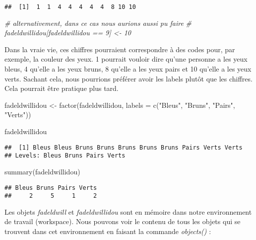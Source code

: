\documentclass[
]{book}
\newenvironment{Shaded}{\begin{snugshade}}{\end{snugshade}}
\newcommand{\AttributeTok}[1]{\textcolor[rgb]{0.77,0.63,0.00}{#1}}
\newcommand{\CommentTok}[1]{\textcolor[rgb]{0.56,0.35,0.01}{\textit{#1}}}
\newcommand{\FunctionTok}[1]{\textcolor[rgb]{0.00,0.00,0.00}{#1}}
\newcommand{\NormalTok}[1]{#1}
\newcommand{\OtherTok}[1]{\textcolor[rgb]{0.56,0.35,0.01}{#1}}
\newcommand{\StringTok}[1]{\textcolor[rgb]{0.31,0.60,0.02}{#1}}
\begin{document}
\begin{verbatim}
##  [1]  1  1  4  4  4  4  4  8 10 10
\end{verbatim}

\begin{Shaded}
\begin{Highlighting}[]
\CommentTok{\# alternativement, dans ce cas nous aurions aussi pu faire }
\CommentTok{\# fadeldwillidou[fadeldwillidou == 9] \textless{}{-} 10}
\end{Highlighting}
\end{Shaded}

Dans la vraie vie, ces chiffres pourraient correspondre à des codes pour, par exemple, la couleur des yeux. 1 pourrait vouloir dire qu'une personne a les yeux bleus, 4 qu'elle a les yeux bruns, 8 qu'elle a les yeux pairs et 10 qu'elle a les yeux verts. Sachant cela, nous pourrions préférer avoir les labels plutôt que les chiffres. Cela pourrait être pratique plus tard.

\begin{Shaded}
\begin{Highlighting}[]
\NormalTok{fadeldwillidou }\OtherTok{\textless{}{-}} \FunctionTok{factor}\NormalTok{(fadeldwillidou, }
                          \AttributeTok{labels =} \FunctionTok{c}\NormalTok{(}\StringTok{"Bleus"}\NormalTok{, }\StringTok{"Bruns"}\NormalTok{, }
                                     \StringTok{"Pairs"}\NormalTok{, }\StringTok{"Verts"}\NormalTok{))}

\NormalTok{fadeldwillidou}
\end{Highlighting}
\end{Shaded}

\begin{verbatim}
##  [1] Bleus Bleus Bruns Bruns Bruns Bruns Bruns Pairs Verts Verts
## Levels: Bleus Bruns Pairs Verts
\end{verbatim}

\begin{Shaded}
\begin{Highlighting}[]
\FunctionTok{summary}\NormalTok{(fadeldwillidou)}
\end{Highlighting}
\end{Shaded}

\begin{verbatim}
## Bleus Bruns Pairs Verts 
##     2     5     1     2
\end{verbatim}

Les objets \emph{fadeldwill} et \emph{fadeldwillidou} sont en mémoire dans notre environnement de travail (workspace). Nous pouvons voir le contenu de tous les objets qui se trouvent dans cet environnement en faisant la commande \emph{objects()} :
\end{document}
